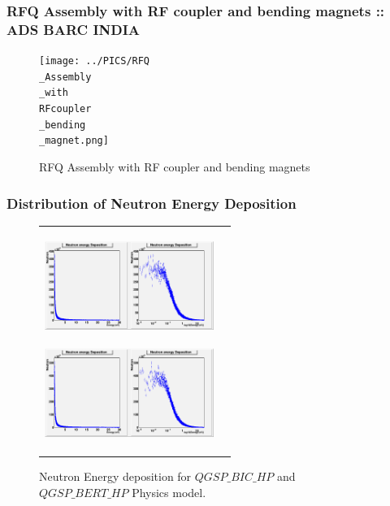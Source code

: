 \documentclass{beamer}
\begin{document}
    \begin{frame}
      \frametitle{RFQ Assembly with RF coupler and bending magnets :: ADS BARC INDIA}
      \begin{figure}
        \texttt{[image: ../PICS/RFQ\\\_Assembly\\\_with\\ RFcoupler\\\_bending\\\_magnet.png]}
        \label{fig:RFQAssem}
        \caption{RFQ Assembly with RF coupler and bending magnets}
      \end{figure}
    \end{frame}
    
    \begin{frame}
        \frametitle{Distribution of Neutron Energy Deposition}
        \begin{figure}
            \begin{tabular}{cc}
                \includegraphics[height=30mm, width=55mm]{../PICS/NeutEdepBIC.png}\label{fig:neutEdepBIC} 
                
                \includegraphics[height=30mm, width=55mm]{../PICS/NeutEdepBERT.png}
                \label{fig:neutEdepBERT} 
            \end{tabular}    
            \caption{Neutron Energy deposition for $QGSP\_BIC\_HP$ and $QGSP\_BERT\_HP$  Physics model.}
        \end{figure}
    \end{frame}
\end{document}
